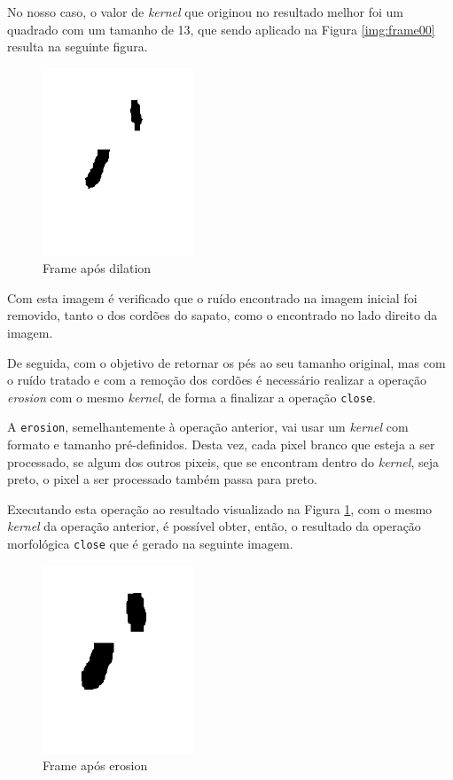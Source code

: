 \documentclass[a4paper]{report}
\begin{document}
No nosso caso, o valor de \textit{kernel} que originou no resultado melhor foi um quadrado com um
tamanho de 13, que sendo aplicado na Figura \ref{img:frame00} resulta na seguinte figura.

\begin{figure}[H]
    \centering
        \includegraphics[width=0.4\textwidth]{images/building/closeDilate/dilate13.png}
        \caption{Frame após dilation}
        \label{img:dilation13}
\end{figure}

Com esta imagem é verificado que o ruído encontrado na imagem inicial foi removido, tanto o dos
cordões do sapato, como o encontrado no lado direito da imagem.

De seguida, com o objetivo de retornar os pés ao seu tamanho original, mas com o ruído tratado e com
a remoção dos cordões é necessário realizar a operação \textit{erosion} com o mesmo \textit{kernel},
de forma a finalizar a operação \texttt{close}.

A \texttt{erosion}, semelhantemente à operação anterior, vai usar um \textit{kernel} com formato e
tamanho pré-definidos. Desta vez, cada pixel branco que esteja a ser processado, se algum dos outros
pixeis, que se encontram dentro do \textit{kernel}, seja preto, o pixel a ser processado também passa
para preto.

Executando esta operação ao resultado visualizado na Figura \ref{img:dilation13}, com o mesmo
\textit{kernel} da operação anterior, é possível obter, então, o resultado da operação morfológica
\texttt{close} que é gerado na seguinte imagem.

\begin{figure}[H]
    \centering
        \includegraphics[width=0.4\textwidth]{images/building/closeDilate/erode13.png}
        \caption{Frame após erosion}
        \label{img:erode13}
\end{figure}
\end{document}
